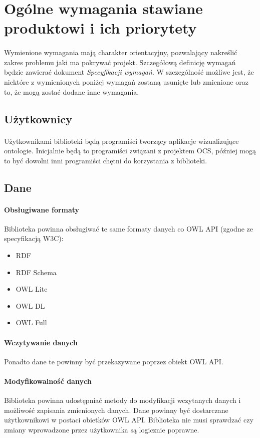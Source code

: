 \documentclass[a4paper,10pt]{article}
\begin{document}
\section{Ogólne wymagania stawiane produktowi i ich priorytety}
\paragraph{} Wymienione wymagania mają charakter orientacyjny, pozwalający nakreślić zakres problemu jaki ma pokrywać projekt. Szczegółową definicję wymagań będzie zawierać dokument \textit{Specyfikacji wymagań}. W szczególność możliwe jest, że niektóre z wymienionych poniżej wymagań zostaną usunięte lub zmienione oraz to, że mogą zostać dodane inne wymagania.

\subsection{Użytkownicy}
\paragraph{} Użytkownikami biblioteki będą programiści tworzący aplikacje wizualizujące ontologie. Inicjalnie będą to programiści związani z projektem OCS, później mogą to być dowolni inni programiści chętni do korzystania z biblioteki.
\subsection{Dane}
\paragraph{Obsługiwane formaty} Biblioteka powinna obsługiwać te same formaty danych co OWL API (zgodne ze specyfikacją W3C):
\begin{itemize}
 	\item RDF
	\item RDF Schema
	\item OWL Lite
	\item OWL DL
	\item OWL Full
\end{itemize}

\paragraph{Wczytywanie danych}Ponadto dane te powinny być przekazywane poprzez obiekt OWL API.

\paragraph{Modyfikowalność danych} Biblioteka powinna udostępniać metody do modyfikacji wczytanych danych i możliwość zapisania zmienionych danych. Dane powinny być dostarczane użytkownikowi w postaci obietków OWL API. Biblioteka nie musi sprawdzać czy zmiany wprowadzone przez użytkownika są logicznie poprawne.
\end{document}
